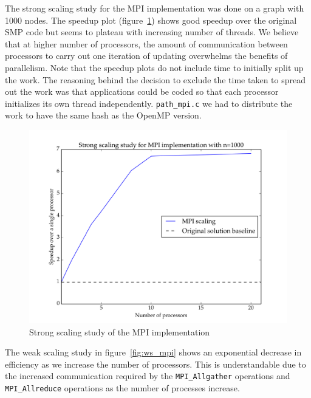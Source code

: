 \documentclass[11pt]{article}
\begin{document}
The strong scaling study for the MPI implementation was done on a graph with 1000 nodes. The speedup plot (figure~\ref{fig:ss_mpi}) shows good speedup over the original SMP code but seems to plateau with increasing number of threads. We believe that at higher number of processors, the amount of communication between processors to carry out one iteration of updating overwhelms the benefits of parallelism. Note that the speedup plots do not include time to initially split up the work. The reasoning behind the decision to exclude the time taken to spread out the work was that applications could be coded so that each processor initializes its own thread independently. \texttt{path\_mpi.c} we had to distribute the work to have the same hash as the OpenMP version. 

\begin{figure}[H]
\centering
\includegraphics[scale=0.5]{./scaling_studies/strong_scaling_mpi.png}
\caption{Strong scaling study of the MPI implementation}
\label{fig:ss_mpi}
\end{figure}

The weak scaling study in figure~\ref{fig:ws_mpi} shows an exponential decrease in efficiency as we increase the number of processors. This is understandable due to the increased communication required by the \texttt{MPI\_Allgather} operations and \texttt{MPI\_Allreduce} operations as the number of processes increase. 
\end{document}
